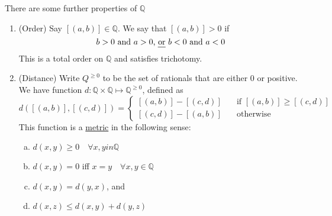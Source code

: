 \documentclass[12pt]{amsart}
\newcommand{\bbQ}{\mathbb{Q}}
\theoremstyle{plain}
\theoremstyle{remark}
\theoremstyle{definition}
\begin{document}
\par
There are some further properties of $\bbQ$
\begin{enumerate}[(1)]
	\item (Order)
		Say $[(a,b)]\in \bbQ$. We say that $[(a,b)] > 0$ if 
		\begin{equation*}
			b > 0 \mbox{ and } a > 0 \mbox{, \ul{or} } b < 0 \mbox{ and } a < 0
		\end{equation*}
		This is a total order on $\bbQ$ and satisfies trichotomy.
	\item (Distance)
		Write $Q^{\geq 0}$ to be the set of rationals that are either $0$ or positive. We have  function $d: \bbQ \times \bbQ \mapsto \bbQ^{\geq 0}$, defined as 
		\begin{equation*}
			d([(a,b)],[(c,d)]) = 
			\begin{cases}
				[(a,b)] - [(c,d)] \quad &\mbox{if } [(a,b)] \geqslant [(c,d)]\\	
				[(c,d)] - [(a,b)] \quad &\mbox{otherwise}
			\end{cases}
		\end{equation*}
		This function is a \ul{metric} in the following sense:
		\begin{enumerate}[a.]
			\item $d(x,y)\geqslant 0 \quad \forall x,y in \bbQ$
			\item $d(x,y) = 0$ iff $x = y \quad \forall x,y \in \bbQ$ 
			\item $d(x,y) = d(y,x)$, and 
			\item $d(x,z) \leqslant d(x,y) + d(y,z)$
		\end{enumerate}
\end{enumerate}
\end{document}
